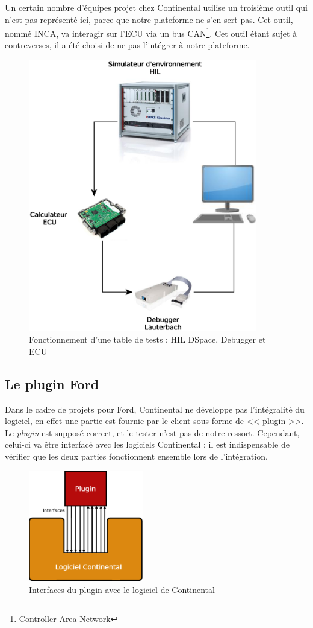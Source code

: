 	\begin{remarque}
		Un certain nombre d'équipes projet chez Continental utilise un troisième outil qui n'est pas représenté ici, parce que notre plateforme ne s'en sert pas. Cet outil, nommé INCA, va interagir sur l'ECU via un bus CAN\footnote{Controller Area Network}. Cet outil étant sujet à contreverses, il a été choisi de ne pas l'intégrer à notre plateforme.
	\end{remarque}
		\begin{figure}[H]
			\centering
			\includegraphics[width=10cm]{contents/images/WB.eps}
			\caption{Fonctionnement d'une table de tests : HIL DSpace, Debugger et ECU}
			\label{fig:wb}
		\end{figure}
		
	\subsection{Le plugin Ford}
	Dans le cadre de projets pour Ford, Continental ne développe pas l'intégralité du logiciel, en effet une partie est fournie par le client sous forme de << plugin >>. Le \textit{plugin} est supposé correct, et le tester n'est pas de notre ressort. Cependant, celui-ci va être interfacé avec les logiciels Continental : il est indispensable de vérifier que les deux parties fonctionnent ensemble lors de l'intégration.
	\begin{figure}[H]
		\centering
		\includegraphics[width=5cm]{contents/images/plugin.eps}
		\caption{Interfaces du plugin avec le logiciel de Continental}
		\label{fig:plugin}	
	\end{figure}
	
